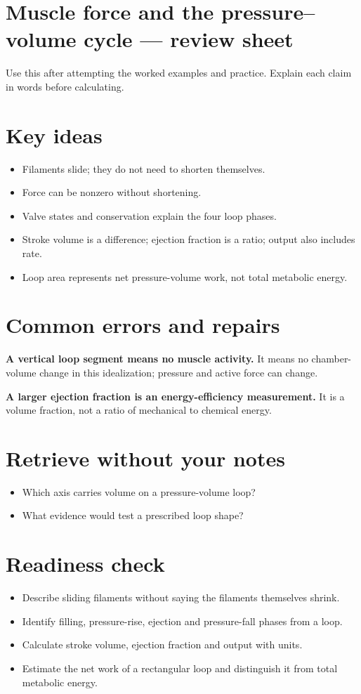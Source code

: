 \documentclass[11pt,letterpaper]{article}
\theoremstyle{definition}\newtheorem{definition}{Definition}\newtheorem{example}{Example}
\numberwithin{equation}{section}
\begin{document}
\section*{Muscle force and the pressure--volume cycle --- review sheet}
Use this after attempting the worked examples and practice. Explain each claim in words before calculating.

\section*{Key ideas}
\begin{itemize}
\item Filaments slide; they do not need to shorten themselves.
\item Force can be nonzero without shortening.
\item Valve states and conservation explain the four loop phases.
\item Stroke volume is a difference; ejection fraction is a ratio; output also includes rate.
\item Loop area represents net pressure-volume work, not total metabolic energy.
\end{itemize}
\section*{Common errors and repairs}
\textbf{A vertical loop segment means no muscle activity.} It means no chamber-volume change in this idealization; pressure and active force can change.

\textbf{A larger ejection fraction is an energy-efficiency measurement.} It is a volume fraction, not a ratio of mechanical to chemical energy.

\section*{Retrieve without your notes}
\begin{itemize}
\item Which axis carries volume on a pressure-volume loop?
\item What evidence would test a prescribed loop shape?
\end{itemize}
\section*{Readiness check}
\begin{itemize}
\item Describe sliding filaments without saying the filaments themselves shrink.
\item Identify filling, pressure-rise, ejection and pressure-fall phases from a loop.
\item Calculate stroke volume, ejection fraction and output with units.
\item Estimate the net work of a rectangular loop and distinguish it from total metabolic energy.
\end{itemize}
\end{document}
